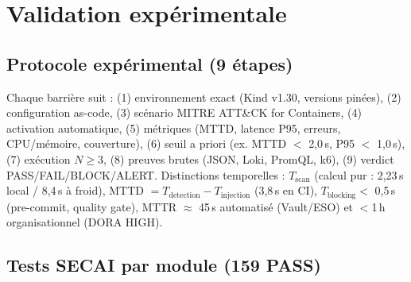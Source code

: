 \documentclass[12pt,a4paper,openany]{report}
\begin{document}
\chapter{Validation expérimentale}
\label{ch:validation}

\section{Protocole expérimental (9 étapes)}

Chaque barrière suit : (1) environnement exact (Kind v1.30, versions pinées),
(2) configuration as-code, (3) scénario MITRE ATT\&CK for Containers,
(4) activation automatique, (5) métriques (MTTD, latence P95, erreurs, CPU/mémoire, couverture),
(6) seuil a priori (ex. MTTD $<$ 2,0\,s, P95 $<$ 1,0\,s),
(7) exécution $N \geq 3$, (8) preuves brutes (JSON, Loki, PromQL, k6),
(9) verdict PASS/FAIL/BLOCK/ALERT.
Distinctions temporelles : $T_{\text{scan}}$ (calcul pur : 2,23\,s local / 8,4\,s à froid),
MTTD $= T_{\text{detection}} - T_{\text{injection}}$ (3,8\,s en CI),
$T_{\text{blocking}} <$ 0,5\,s (pre-commit, quality gate),
MTTR $\approx$ 45\,s automatisé (Vault/ESO) et $<$1\,h organisationnel (DORA HIGH).

\section{Tests SECAI par module (159 PASS)}
\end{document}
